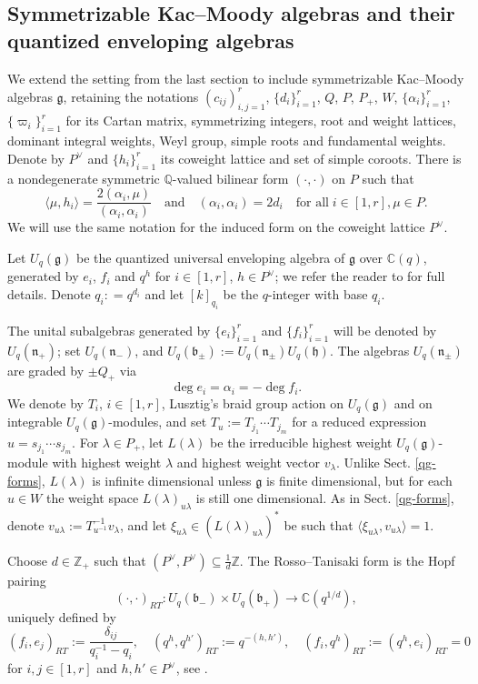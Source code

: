 \documentclass[11pt]{amsart}
\theoremstyle{plain}
\def \Zset {{\mathbb Z}}
\def \Cset {{\mathbb C}}
\def \Qset {{\mathbb Q}}
\def \al {\alpha}
\def \vpi {\varpi}
\def \la {\lambda}
\def \g  {\mathfrak{g}}   %
\def \h  {\mathfrak{h}}
\def \n  {\mathfrak{n}}
\def \b  {\mathfrak{b}}
\begin{document}
\subsection{Symmetrizable Kac--Moody algebras and their quantized enveloping algebras}
\label{unip-KM}
We extend the setting from the last section to include symmetrizable Kac--Moody algebras $\g$, retaining the notations $(c_{ij})_{i,j=1}^r$,
$\{d_i\}_{i=1}^r$, $Q$, $P$, $P_+$, $W$, 
$\{\al_i\}_{i=1}^r$, 
$\{\vpi_i\}_{i=1}^r$ 
for its Cartan matrix, symmetrizing integers, root and weight lattices, dominant integral weights, Weyl group, simple roots and fundamental weights. Denote by $P^\vee$ and $\{ h_i\}_{i=1}^r$ its coweight lattice and set of simple coroots. There is a nondegenerate symmetric $\Qset$-valued bilinear form $(\cdot, \cdot)$ on $P$ such that
\[
\langle \mu, h_i \rangle = \frac{2 (\al_i, \mu)}{(\al_i, \al_i)} \quad \mbox{and} \quad (\al_i, \al_i) = 2 d_i \quad \mbox{for all} \; i \in [1,r], \mu \in P.
\]
We will use the same notation for the induced form on the coweight lattice $P^\vee$. 

Let $U_q(\g)$ be the quantized universal enveloping algebra of $\g$ over $\Cset(q)$, generated by $e_i$, $f_i$ and $q^h$ for $i \in [1,r]$, $h \in P^\vee$; we refer the reader to \cite[Sect. 1.1]{Kas91} for full details. Denote $q_i : = q^{d_i}$ and let $[k]_{q_i}$ be the $q$-integer with base $q_i$. 

The unital subalgebras generated by $\{e_i\}_{i=1}^r$ and $\{ f_i \}_{i=1}^r$ will be denoted by $U_q(\n_+)$; set $U_q(\n_-)$, and $U_q(\b_\pm) := U_q(\n_\pm) U_q(\h)$. The algebras $U_q(\n_\pm)$ are graded by $\pm Q_+$ via 
\begin{equation}
    \label{Un-grad}
\deg e_i = \al_i = - \deg f_i.
\end{equation}
We denote by $T_i$, $i \in [1,r]$, Lusztig's braid group action on $U_q(\g)$ and on integrable $U_q(\g)$-modules, and set $T_u := T_{j_1} \cdots T_{j_m}$ for a reduced expression $u = s_{j_1} \cdots s_{j_m}$. For $\la \in P_+$, let $L(\la)$ be the irreducible highest weight $U_q(\g)$-module with highest weight $\la$ and highest weight vector $v_\la$. Unlike Sect. \ref{qg-forms}, $L(\la)$ is infinite dimensional unless $\g$ is finite dimensional, but for each $u \in W$ the weight space $L(\la)_{u\la}$ is still one dimensional. As in Sect. \ref{qg-forms}, denote $v_{u\la} := T_{u^{-1}}^{-1} v_\la$, and let $\xi_{u\la} \in (L(\la)_{u\la})^*$ be such that $\langle \xi_{u\la}, v_{u\la} \rangle = 1$.

Choose $d \in \Zset_+$ such that $(P^\vee, P^\vee) \subseteq \frac{1}{d} \Zset$. The Rosso--Tanisaki form is the Hopf pairing
\[
(\cdot, \cdot)_{RT} : U_q(\b_-) \times U_q(\b_+) \to \Cset(q^{1/d}),
\]
uniquely defined by
\[
(f_i, e_j)_{RT} := \frac{\delta_{ij}}{q_i^{-1} - q_i}, \quad 
(q^h, q^{h'})_{RT} := q^{-(h,h')}, \quad 
(f_i, q^h)_{RT} := (q^h, e_i)_{RT} = 0
\]
for $i, j \in [1,r]$ and $h, h' \in P^\vee$, 
see \cite[Eq. (5.5)]{GY2}.  
\end{document}
